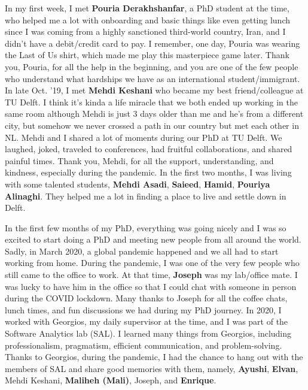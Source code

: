In my first week, I met \textbf{Pouria Derakhshanfar}, a PhD student at the time, who helped me a lot with onboarding and basic things like even getting lunch since I was coming from a highly sanctioned third-world country, Iran, and I didn't have a debit/credit card to pay. I remember, one day, Pouria was wearing the Last of Us shirt, which made me play this masterpiece game later. Thank you, Pouria, for all the help in the beginning, and you are one of the few people who understand what hardships we have as an international student/immigrant. In late Oct. '19, I met \textbf{Mehdi Keshani} who became my best friend/colleague at TU Delft. I think it's kinda a life miracle that we both ended up working in the same room although Mehdi is just 3 days older than me and he's from a different city, but somehow we never crossed a path in our country but met each other in NL. Mehdi and I shared a lot of moments during our PhD at TU Delft. We laughed, joked, traveled to conferences, had fruitful collaborations, and shared painful times. Thank you, Mehdi, for all the support, understanding, and kindness, especially during the pandemic. In the first two months, I was living with some talented students, \textbf{Mehdi Asadi}, \textbf{Saieed}, \textbf{Hamid}, \textbf{Pouriya Alinaghi}. They helped me a lot in finding a place to live and settle down in Delft.

In the first few months of my PhD, everything was going nicely and I was so excited to start doing a PhD and meeting new people from all around the world. Sadly, in March 2020, a global pandemic happened and we all had to start working from home. During the pandemic, I was one of the very few people who still came to the office to work. At that time, \textbf{Joseph} was my lab/office mate. I was lucky to have him in the office so that I could chat with someone in person during the COVID lockdown. Many thanks to Joseph for all the coffee chats, lunch times, and fun discussions we had during my PhD journey. In 2020, I worked with Georgios, my daily supervisor at the time, and I was part of the Software Analytics lab (SAL). I learned many things from Georgios, including professionalism, pragmatism, efficient communication, and problem-solving. Thanks to Georgios, during the pandemic, I had the chance to hang out with the members of SAL and share good memories with them, namely, \textbf{Ayushi}, \textbf{Elvan}, Mehdi Keshani, \textbf{Maliheh (Mali)}, Joseph, and \textbf{Enrique}.

